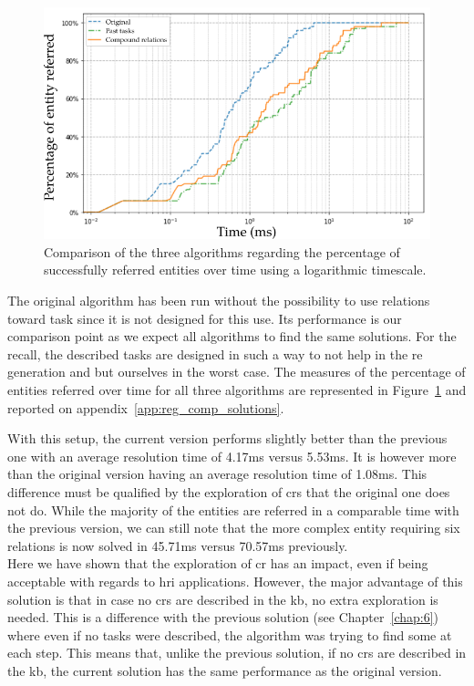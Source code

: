 \begin{figure}[ht!]
\centering
\includegraphics[scale=0.5]{figures/chapter7/comparison.png}
\caption{\label{fig:chap7_compare} Comparison of the three algorithms regarding the percentage of successfully referred entities over time using a logarithmic timescale. }
\end{figure}

The original algorithm has been run without the possibility to use relations toward task since it is not designed for this use. Its performance is our comparison point as we expect all algorithms to find the same solutions. For the recall, the described tasks are designed in such a way to not help in the \acrshort{re} generation and but ourselves in the worst case. The measures of the percentage of entities referred over time for all three algorithms are represented in Figure~\ref{fig:chap7_compare} and reported on appendix~\ref{app:reg_comp_solutions}.

With this setup, the current version performs slightly better than the previous one with an average resolution time of 4.17ms versus 5.53ms. It is however more than the original version having an average resolution time of 1.08ms. This difference must be qualified by the exploration of \acrshort{cr}s that the original one does not do. While the majority of the entities are referred in a comparable time with the previous version, we can still note that the more complex entity requiring six relations is now solved in 45.71ms versus 70.57ms previously. \\

Here we have shown that the exploration of \acrshort{cr} has an impact, even if being acceptable with regards to \acrshort{hri} applications. However, the major advantage of this solution is that in case no \acrshort{cr}s are described in the \acrshort{kb}, no extra exploration is needed. This is a difference with the previous solution (see Chapter~\ref{chap:6}) where even if no tasks were described, the algorithm was trying to find some at each step. This means that, unlike the previous solution, if no \acrshort{cr}s are described in the \acrshort{kb}, the current solution has the same performance as the original version.

